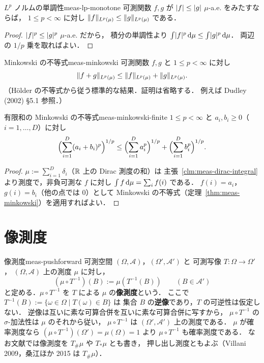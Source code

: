 \begin{claim}{$L^p$ ノルムの単調性}{meas-lp-monotone}
  可測関数 $f,g$ が $\lvert f \rvert\leq\lvert g \rvert$ $\mu$-a.e. をみたすならば，
  $1\leq p<\infty$ に対し
  $\lVert f \rVert_{L^p(\mu)}\leq\lVert g \rVert_{L^p(\mu)}$ である．
\end{claim}

\begin{proof}
  $\lvert f \rvert^p\leq\lvert g \rvert^p$ $\mu$-a.e. だから，
  積分の単調性より
  $\int\lvert f \rvert^p\,\mathrm{d}\mu\leq\int\lvert g \rvert^p\,\mathrm{d}\mu$．
  両辺の $1/p$ 乗を取ればよい．
\end{proof}

\begin{theorem}{Minkowski の不等式}{meas-minkowski}
  可測関数 $f,g$ と $1\leq p<\infty$ に対し
  \[
    \lVert f+g \rVert_{L^p(\mu)}
    \leq
    \lVert f \rVert_{L^p(\mu)}+\lVert g \rVert_{L^p(\mu)}.
  \]
  （Hölder の不等式から従う標準的な結果．証明は省略する．
  例えば Dudley (2002) §5.1 参照．）
\end{theorem}

\begin{corollary}{有限和の Minkowski の不等式}{meas-minkowski-finite}
  $1\leq p<\infty$ と $a_i,b_i\geq0$（$i=1,\dots,D$）に対し
  \[
    \Bigl(\sum_{i=1}^D(a_i+b_i)^p\Bigr)^{1/p}
    \leq\Bigl(\sum_{i=1}^Da_i^p\Bigr)^{1/p}
    +\Bigl(\sum_{i=1}^Db_i^p\Bigr)^{1/p}.
  \]
\end{corollary}

\begin{proof}
  $\mu:=\sum_{i=1}^D\delta_i$（$\mathbb{R}$ 上の Dirac 測度の和）は
  主張~\ref{clm:meas-dirac-integral}より測度で，非負可測な $f$ に対し
  $\int f\,\mathrm{d}\mu=\sum_if(i)$ である．
  $f(i)=a_i$，$g(i)=b_i$（他の点では $0$）として
  Minkowski の不等式（定理~\ref{thm:meas-minkowski}）を適用すればよい．
\end{proof}

\section{像測度}

\begin{definition}{像測度}{meas-pushforward}
  可測空間 $(\Omega,\mathcal{A})$，$(\Omega',\mathcal{A}')$ と
  可測写像 $T\colon\Omega\to\Omega'$，
  $(\Omega,\mathcal{A})$ 上の測度 $\mu$ に対し，
  \[
    (\mu\circ T^{-1})(B):=\mu(T^{-1}(B))
    \qquad(B\in\mathcal{A}')
  \]
  と定める．$\mu\circ T^{-1}$ を $T$ による $\mu$ の\textbf{像測度}という．
  ここで $T^{-1}(B):=\{\omega\in\Omega\mid T(\omega)\in B\}$ は
  集合 $B$ の\textbf{逆像}であり，$T$ の可逆性は仮定しない．
  逆像は互いに素な可算合併を互いに素な可算合併に写すから，
  $\mu\circ T^{-1}$ の $\sigma$-加法性は $\mu$ のそれから従い，
  $\mu\circ T^{-1}$ は $(\Omega',\mathcal{A}')$ 上の測度である．
  $\mu$ が確率測度なら
  $(\mu\circ T^{-1})(\Omega')=\mu(\Omega)=1$ より
  $\mu\circ T^{-1}$ も確率測度である．
  なお文献では像測度を $T_\#\mu$ や $T_*\mu$ とも書き，
  押し出し測度ともよぶ（Villani 2009，桑江ほか 2015 は $T_\#\mu$）．
\end{definition}

